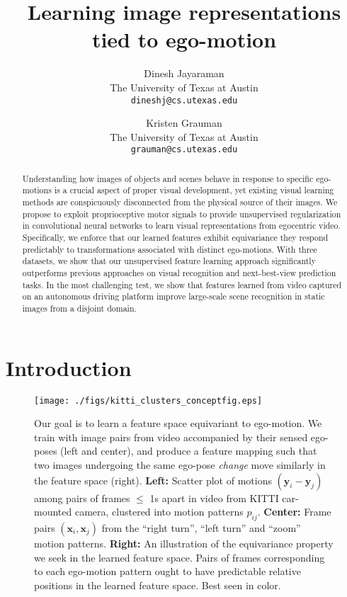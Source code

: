 \documentclass[10pt,twocolumn,letterpaper]{article}
\begin{document}
%
\title{Learning image representations tied to ego-motion}

\author{Dinesh Jayaraman\\
The University of Texas at Austin\\
{\tt\small dineshj@cs.utexas.edu}
\and
Kristen Grauman\\
The University of Texas at Austin\\
{\tt\small grauman@cs.utexas.edu}
}

\maketitle
%

\begin{abstract}
  Understanding how images of objects and scenes behave in response to specific ego-motions is a crucial aspect of proper visual development, yet existing visual learning methods are conspicuously disconnected from the physical source of their images.  We propose to exploit proprioceptive motor signals to provide unsupervised regularization in convolutional neural networks to learn visual representations from egocentric video. Specifically, we enforce that our learned features exhibit equivariance \ie they respond predictably to transformations associated with distinct ego-motions.  With three datasets, we show that our unsupervised feature learning approach significantly outperforms previous approaches on visual recognition and next-best-view prediction tasks.  In the most challenging test, we show that features learned from video captured on an autonomous driving platform improve large-scale scene recognition in static images from a disjoint domain.
\end{abstract}
\vspace{-0.1in}\section{Introduction}\label{sec:intro}\begin{figure*}[t]
  \centering
  \texttt{[image: ./figs/kitti\_clusters\_conceptfig.eps]}
  \caption{Our goal is to learn a feature space equivariant to ego-motion.  We train with image pairs from video accompanied by their sensed ego-poses (left and center), and produce a feature mapping such that two images undergoing the same ego-pose \emph{change} move similarly in the feature space (right).  \textbf{Left:}  Scatter plot of motions $(\bm{y}_i - \bm{y}_j)$ among pairs of frames $\leq$ 1s apart in video from KITTI car-mounted camera, clustered into motion patterns $p_{ij}$. \textbf{Center:} Frame pairs $(\bm{x}_i,\bm{x}_j)$ from the ``right turn'', ``left turn'' and ``zoom'' motion patterns. \textbf{Right:} An illustration of the equivariance property we seek in the learned feature space. Pairs of frames corresponding to each ego-motion pattern ought to have predictable relative positions in the learned feature space.  Best seen in color.}
\vspace{-0.1in}
  \label{fig:conceptfig}
\end{figure*}%
\end{document}
